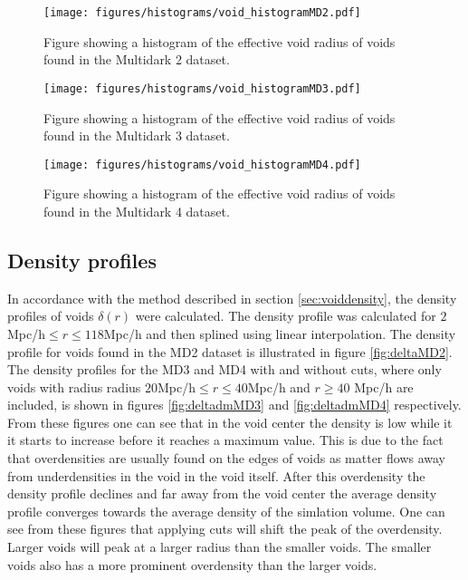 \begin{figure}[H]
    \texttt{[image: figures/histograms/void\_histogramMD2.pdf]}
    \caption{Figure showing a histogram of the effective void radius of voids found in the Multidark 2 dataset.}
    \label{fig:voidhistMD2}
\end{figure}
\begin{figure}[H]
    \texttt{[image: figures/histograms/void\_histogramMD3.pdf]}
    \caption{Figure showing a histogram of the effective void radius of voids found in the Multidark 3 dataset.}
    \label{fig:voidhistMD3}
\end{figure}
\begin{figure}[H]
    \texttt{[image: figures/histograms/void\_histogramMD4.pdf]}
    \caption{Figure showing a histogram of the effective void radius of voids found in the Multidark 4 dataset.}
    \label{fig:voidhistMD4}
\end{figure}
\subsection{Density profiles}
In accordance with the method described in section \ref{sec:voiddensity}, the density profiles of voids $\delta(r)$ were calculated. The density profile was calculated for $2$Mpc/h$\leq r\leq 118$Mpc/h and then splined using linear interpolation. The density profile for voids found in the MD2 dataset is illustrated in figure \ref{fig:deltaMD2}. The density profiles for the MD3 and MD4 with and without cuts, where only voids with radius radius $20$Mpc/h$\leq r\leq 40$Mpc/h and $r\geq 40$ Mpc/h are included, is shown in figures \ref{fig:deltadmMD3} and \ref{fig:deltadmMD4} respectively. From these figures one can see that in the void center the density is low while it it starts to increase before it reaches a maximum value. This is due to the fact that overdensities are usually found on the edges of voids as matter flows away from underdensities in the void in the void itself. After this overdensity the density profile declines and far away from the void center the average density profile converges towards the average density of the simlation volume. One can see from these figures that applying cuts will shift the peak of the overdensity. Larger voids will peak at a larger radius than the smaller voids. The smaller voids also has a more prominent overdensity than the larger voids.\\\indent
 

